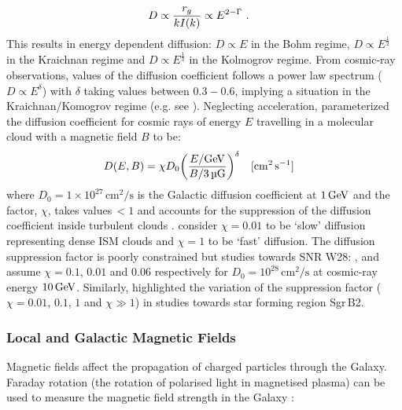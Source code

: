 \begin{equation}
    \begin{aligned}
        D&\propto \frac{r_g}{kI\qty(k)}\propto E^{2-\Gamma} \text{ .}
    \end{aligned}
\end{equation}
This results in energy dependent diffusion: $D\propto E$ in the Bohm regime, $D\propto E^{\frac{1}{2}}$ in the Kraichnan regime and $D\propto E^{\frac{1}{3}}$ in the Kolmogrov regime. From cosmic-ray observations, values of the diffusion coefficient follows a power law spectrum ($D\propto E^{\delta}$) with $\delta$ taking values between $0.3-0.6$, implying a situation in the Kraichnan/Komogrov regime (e.g. see \cite{2007ARNPS..57..285S}).
\newpar 
Neglecting acceleration, \cite{2007Ap&SS.309..365G} parameterized the diffusion coefficient for cosmic rays of energy $E$ travelling in a molecular cloud with a magnetic field $B$ to be:
\begin{align}
    D\qty(E,B)&=\chi D_0\qty(\frac{E/\GeV}{B/3\,\si{\micro G}})^\delta\quad [\si{\centi\meter\squared\per\second}] \label{eq:diffusion}
\end{align}
where $D_0=1\times 10^{27}\,\si{\centi\meter\squared\per\second}$ is the Galactic diffusion coefficient at $1\,\GeV$ and the factor, $\chi$, takes values\,$<1$ and accounts for the suppression of the diffusion coefficient inside turbulent clouds \citep{1990acr..book.....B}. \cite{1996A&A...309..917A} consider $\chi=0.01$ to be `slow' diffusion representing dense ISM clouds \citep{1988ApJ...334..722O} and $\chi=1$ to be `fast' diffusion. The diffusion suppression factor is poorly constrained but studies towards SNR W28: \citep{2010MNRAS.409L..35L}, \citep{2010A&A...516L..11G} and \cite{2010sf2a.conf..313G} assume $\chi=0.1$, $0.01$ and $0.06$ respectively for $D_0=10^{28}\,\si{\centi\meter\squared\per\second}$ at cosmic-ray energy $10\,\GeV$. Similarly, \cite{2008MNRAS.390..683P} highlighted the variation of the suppression factor ($\chi=0.01$, $0.1$, $1$ and $\chi \gg 1$) in studies towards star forming region Sgr\,B2.

\subsubsection{Local and Galactic Magnetic Fields}

Magnetic fields affect the propagation of charged particles through the Galaxy. Faraday rotation (the rotation of polarised light in magnetised plasma) can be used to measure the magnetic field strength in the Galaxy \citep{1846RSPT..136....1F}:

